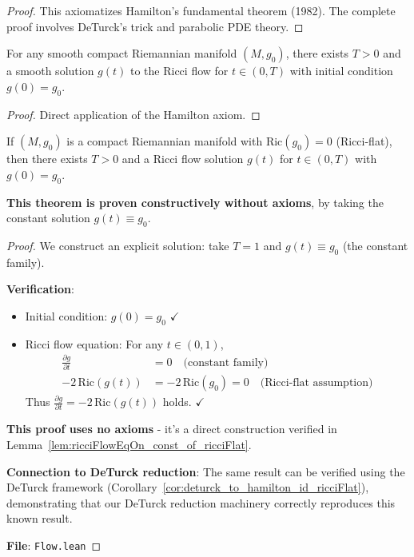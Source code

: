 \begin{proof}
This axiomatizes Hamilton's fundamental theorem (1982). The complete proof involves DeTurck's trick and parabolic PDE theory.
\end{proof}

\begin{theorem}
\label{thm:short_time_existence}
\leanok
{}
For any smooth compact Riemannian manifold $(M, g_0)$, there exists $T > 0$ and a smooth solution $g(t)$ to the Ricci flow for $t \in (0, T)$ with initial condition $g(0) = g_0$.
\end{theorem}

\begin{proof}
\leanok
Direct application of the Hamilton axiom.
\end{proof}

\begin{theorem}
\label{thm:short_time_existence_ricciflat}
\leanok
{}
If $(M, g_0)$ is a compact Riemannian manifold with $\mathrm{Ric}(g_0) = 0$ (Ricci-flat), then there exists $T > 0$ and a Ricci flow solution $g(t)$ for $t \in (0, T)$ with $g(0) = g_0$.

\textbf{This theorem is proven constructively without axioms}, by taking the constant solution $g(t) \equiv g_0$.
\end{theorem}

\begin{proof}
\leanok
{}
We construct an explicit solution: take $T = 1$ and $g(t) \equiv g_0$ (the constant family).

\textbf{Verification}:
\begin{itemize}
\item Initial condition: $g(0) = g_0$ $\checkmark$
\item Ricci flow equation: For any $t \in (0, 1)$,
\begin{align*}
\frac{\partial g}{\partial t} &= 0 \quad \text{(constant family)} \\
-2 \, \mathrm{Ric}(g(t)) &= -2 \, \mathrm{Ric}(g_0) = 0 \quad \text{(Ricci-flat assumption)}
\end{align*}
Thus $\frac{\partial g}{\partial t} = -2 \, \mathrm{Ric}(g(t))$ holds. $\checkmark$
\end{itemize}

\textbf{This proof uses no axioms} - it's a direct construction verified in Lemma~\ref{lem:ricciFlowEqOn_const_of_ricciFlat}.

\textbf{Connection to DeTurck reduction}: The same result can be verified using the DeTurck framework (Corollary~\ref{cor:deturck_to_hamilton_id_ricciFlat}), demonstrating that our DeTurck reduction machinery correctly reproduces this known result.

\textbf{File}: \texttt{Flow.lean}
\end{proof}

